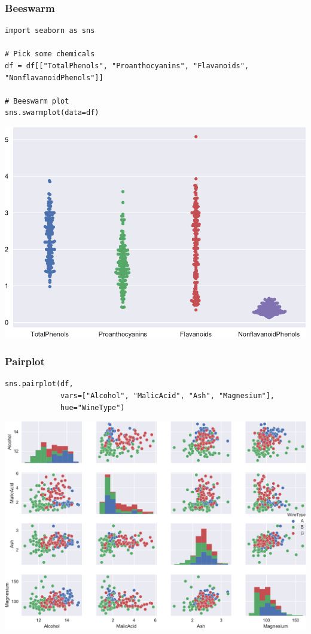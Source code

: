 \documentclass[pdf]{beamer}
\begin{document}
\begin{frame}[fragile]
\frametitle{Beeswarm}

\begin{lstlisting}[style=python]
import seaborn as sns

# Pick some chemicals
df = df[["TotalPhenols", "Proanthocyanins", "Flavanoids", "NonflavanoidPhenols"]]

# Beeswarm plot
sns.swarmplot(data=df)
\end{lstlisting}

\vspace{-0.7cm}
\begin{center}
	\includegraphics[width=.5\textwidth]{beeswarm.pdf}
\end{center}

\end{frame}

\begin{frame}[fragile]
\frametitle{Pairplot}

\begin{lstlisting}[style=python]
sns.pairplot(df, 
             vars=["Alcohol", "MalicAcid", "Ash", "Magnesium"],
             hue="WineType")
\end{lstlisting}

\vspace{-0.7cm}
\begin{center}
	\includegraphics[width=.75\textwidth]{pairplot.pdf}
\end{center}

\end{frame}
\end{document}
